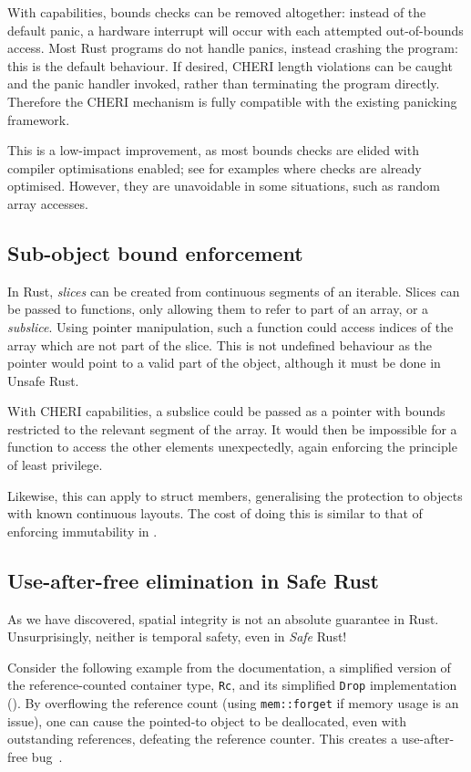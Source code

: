 \documentclass[dissertation.tex]{subfiles}
\begin{document}
With capabilities, bounds checks can be removed altogether: instead of
the default panic, a hardware interrupt will occur with each attempted
out-of-bounds access.
Most Rust programs do not handle panics, instead crashing the program:
this is the default behaviour.
If desired, CHERI length violations can be caught and the panic handler
invoked, rather than terminating the program directly.
Therefore the CHERI mechanism is fully compatible with the existing
panicking framework.

This is a low-impact improvement, as most bounds checks are elided with
compiler optimisations enabled; see  for examples
where checks are already optimised.
However, they are unavoidable in some situations, such as random array
accesses.


\subsection{Sub-object bound enforcement}

In Rust, \emph{slices} can be created from continuous segments of an
iterable.
Slices can be passed to functions, only allowing them to refer to part
of an array, or a \emph{subslice}.
Using pointer manipulation, such a function could access indices of the
array which are not part of the slice.
This is not undefined behaviour as the pointer would point to a valid
part of the object, although it must be done in Unsafe Rust.

With CHERI capabilities, a subslice could be passed as a pointer with
bounds restricted to the relevant segment of the array.
It would then be impossible for a function to access the other elements
unexpectedly, again enforcing the principle of least privilege.

Likewise, this can apply to struct members, generalising the protection
to objects with known continuous layouts.
The cost of doing this is similar to that of enforcing immutability in
.


\subsection{Use-after-free elimination in Safe Rust}
\label{sec:eval-rust-use-after-free}

As we have discovered, spatial integrity is not an absolute guarantee in
Rust.
Unsurprisingly, neither is temporal safety, even in \emph{Safe} Rust!

Consider the following example from the documentation, a simplified
version of the reference-counted container type, \texttt{Rc}, and its
simplified \texttt{Drop} implementation ().
By overflowing the reference count (using \texttt{mem::forget} if memory
usage is an issue), one can cause the pointed-to object to be
deallocated, even with outstanding references, defeating the reference
counter.
This creates a use-after-free bug~\cite{rust-nomicon-rc-leak}.
\end{document}
